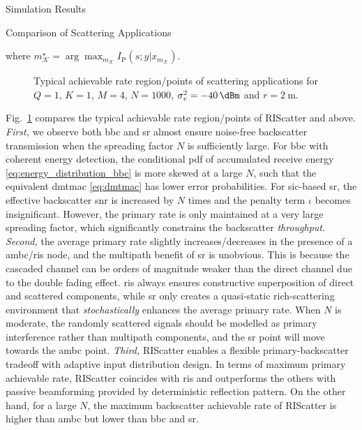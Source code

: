 \documentclass[journal,12pt,onecolumn,draftclsnofoot]{IEEEtran}
\theoremstyle{remark}
\begin{document}
\begin{section}{Simulation Results}
\begin{subsection}{Comparison of Scattering Applications}
\begin{itemize}
\begin{equation}
			\end{equation}
			where $m_{\mathcal{K}}^{\star} = \arg \max_{m_{\mathcal{K}}} I_{\text{P}}(s;y|x_{m_{\mathcal{K}}})$.
		\end{itemize}
		\begin{figure}[!t]
			\centering
			\resizebox{0.4\columnwidth}{!}{
				
			}
			\caption{Typical achievable rate region/points of scattering applications for $Q=1$, $K=1$, $M=4$, $N=1000$, $\sigma_v^2=\qty{-40}{\dBm}$ and $r=\qty{2}{\meter}$.}
			\label{fg:region_comparison}
		\end{figure}

		Fig.~\ref{fg:region_comparison} compares the typical achievable rate region/points of RIScatter and above.
		\emph{First,} we observe both \gls{bbc} and \gls{sr} almost ensure noise-free backscatter transmission when the spreading factor $N$ is sufficiently large.
		For \gls{bbc} with coherent energy detection, the conditional \gls{pdf} of accumulated receive energy \eqref{eq:energy_distribution_bbc} is more skewed at a large $N$, such that the equivalent \gls{dmtmac} \eqref{eq:dmtmac} has lower error probabilities.
		For \gls{sic}-based \gls{sr}, the effective backscatter \gls{snr} is increased by $N$ times and the penalty term $\iota$ becomes insignificant.
		However, the primary rate is only maintained at a very large spreading factor, which significantly constrains the backscatter \emph{throughput}.
		\emph{Second,} the average primary rate slightly increases/decreases in the presence of a \gls{ambc}/\gls{ris} node, and the multipath benefit of \gls{sr} is unobvious.
		This is because the cascaded channel can be orders of magnitude weaker than the direct channel due to the double fading effect.
		\gls{ris} always ensures constructive superposition of direct and scattered components, while \gls{sr} only creates a quasi-static rich-scattering environment that \emph{stochastically} enhances the average primary rate.
		When $N$ is moderate, the randomly scattered signals should be modelled as primary interference rather than multipath components, and the \gls{sr} point will move towards the \gls{ambc} point.
		\emph{Third,} RIScatter enables a flexible primary-backscatter tradeoff with adaptive input distribution design.
		In terms of maximum primary achievable rate, RIScatter coincides with \gls{ris} and outperforms the others with passive beamforming provided by deterministic reflection pattern.
		On the other hand, for a large $N$, the maximum backscatter achievable rate of RIScatter is higher than \gls{ambc} but lower than \gls{bbc} and \gls{sr}.

\end{subsection}
\end{section}
\end{document}
